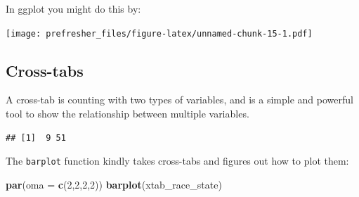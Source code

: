 \documentclass[]{book}
\newenvironment{Shaded}{\begin{snugshade}}{\end{snugshade}}
\newcommand{\KeywordTok}[1]{\textcolor[rgb]{0.13,0.29,0.53}{\textbf{#1}}}
\newcommand{\DataTypeTok}[1]{\textcolor[rgb]{0.13,0.29,0.53}{#1}}
\newcommand{\DecValTok}[1]{\textcolor[rgb]{0.00,0.00,0.81}{#1}}
\newcommand{\StringTok}[1]{\textcolor[rgb]{0.31,0.60,0.02}{#1}}
\newcommand{\OperatorTok}[1]{\textcolor[rgb]{0.81,0.36,0.00}{\textbf{#1}}}
\newcommand{\NormalTok}[1]{#1}
\theoremstyle{definition}
\theoremstyle{definition}
\theoremstyle{definition}
\theoremstyle{remark}
\begin{document}
In ggplot you might do this by:

\begin{Shaded}
\end{Shaded}

\texttt{[image: prefresher\_files/figure-latex/unnamed-chunk-15-1.pdf]}

\subsection{Cross-tabs}\label{cross-tabs}

A cross-tab is counting with two types of variables, and is a simple and
powerful tool to show the relationship between multiple variables.

\begin{Shaded}
\end{Shaded}

\begin{verbatim}
## [1]  9 51
\end{verbatim}

The \texttt{barplot} function kindly takes cross-tabs and figures out
how to plot them:

\begin{Shaded}
\begin{Highlighting}[]
\KeywordTok{par}\NormalTok{(}\DataTypeTok{oma =} \KeywordTok{c}\NormalTok{(}\DecValTok{2}\NormalTok{,}\DecValTok{2}\NormalTok{,}\DecValTok{2}\NormalTok{,}\DecValTok{2}\NormalTok{))}
\KeywordTok{barplot}\NormalTok{(xtab_race_state)}
\end{Highlighting}
\end{Shaded}
\end{document}
